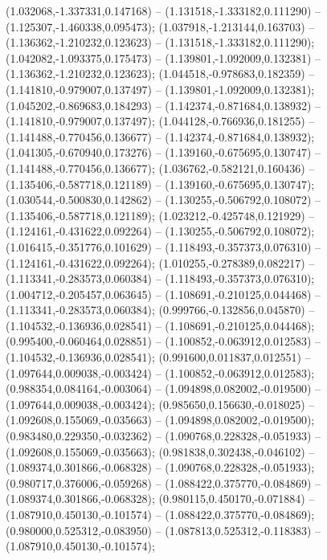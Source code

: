  (1.032068,-1.337331,0.147168) -- (1.131518,-1.333182,0.111290) -- (1.125307,-1.460338,0.095473);
 (1.037918,-1.213144,0.163703) -- (1.136362,-1.210232,0.123623) -- (1.131518,-1.333182,0.111290);
 (1.042082,-1.093375,0.175473) -- (1.139801,-1.092009,0.132381) -- (1.136362,-1.210232,0.123623);
 (1.044518,-0.978683,0.182359) -- (1.141810,-0.979007,0.137497) -- (1.139801,-1.092009,0.132381);
 (1.045202,-0.869683,0.184293) -- (1.142374,-0.871684,0.138932) -- (1.141810,-0.979007,0.137497);
 (1.044128,-0.766936,0.181255) -- (1.141488,-0.770456,0.136677) -- (1.142374,-0.871684,0.138932);
 (1.041305,-0.670940,0.173276) -- (1.139160,-0.675695,0.130747) -- (1.141488,-0.770456,0.136677);
 (1.036762,-0.582121,0.160436) -- (1.135406,-0.587718,0.121189) -- (1.139160,-0.675695,0.130747);
 (1.030544,-0.500830,0.142862) -- (1.130255,-0.506792,0.108072) -- (1.135406,-0.587718,0.121189);
 (1.023212,-0.425748,0.121929) -- (1.124161,-0.431622,0.092264) -- (1.130255,-0.506792,0.108072);
 (1.016415,-0.351776,0.101629) -- (1.118493,-0.357373,0.076310) -- (1.124161,-0.431622,0.092264);
 (1.010255,-0.278389,0.082217) -- (1.113341,-0.283573,0.060384) -- (1.118493,-0.357373,0.076310);
 (1.004712,-0.205457,0.063645) -- (1.108691,-0.210125,0.044468) -- (1.113341,-0.283573,0.060384);
 (0.999766,-0.132856,0.045870) -- (1.104532,-0.136936,0.028541) -- (1.108691,-0.210125,0.044468);
 (0.995400,-0.060464,0.028851) -- (1.100852,-0.063912,0.012583) -- (1.104532,-0.136936,0.028541);
 (0.991600,0.011837,0.012551) -- (1.097644,0.009038,-0.003424) -- (1.100852,-0.063912,0.012583);
 (0.988354,0.084164,-0.003064) -- (1.094898,0.082002,-0.019500) -- (1.097644,0.009038,-0.003424);
 (0.985650,0.156630,-0.018025) -- (1.092608,0.155069,-0.035663) -- (1.094898,0.082002,-0.019500);
 (0.983480,0.229350,-0.032362) -- (1.090768,0.228328,-0.051933) -- (1.092608,0.155069,-0.035663);
 (0.981838,0.302438,-0.046102) -- (1.089374,0.301866,-0.068328) -- (1.090768,0.228328,-0.051933);
 (0.980717,0.376006,-0.059268) -- (1.088422,0.375770,-0.084869) -- (1.089374,0.301866,-0.068328);
 (0.980115,0.450170,-0.071884) -- (1.087910,0.450130,-0.101574) -- (1.088422,0.375770,-0.084869);
 (0.980000,0.525312,-0.083950) -- (1.087813,0.525312,-0.118383) -- (1.087910,0.450130,-0.101574);
